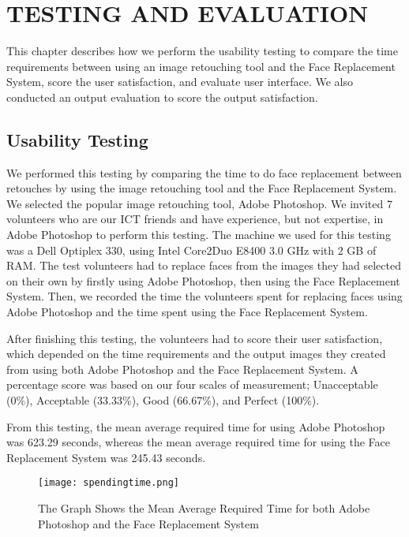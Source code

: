 \chapter{TESTING AND EVALUATION}\label{chap:TESTING AND EVALUATION}
\hspace{0.5in}This chapter describes how we perform the usability testing to compare the time requirements between using an image retouching tool and the Face Replacement System, score the user satisfaction, and evaluate user interface. We also conducted an output evaluation to score the output satisfaction.

\section{Usability Testing}
\hspace{0.5in}We performed this testing by comparing the time to do face replacement between retouches by using the image retouching tool and the Face Replacement System. We selected the popular image retouching tool, Adobe Photoshop. We invited 7 volunteers who are our ICT friends and have experience, but not expertise, in Adobe Photoshop to perform this testing. The machine we used for this testing was a Dell Optiplex 330, using Intel Core2Duo E8400 3.0 GHz with 2 GB of RAM. The test volunteers had to replace faces from the images they had selected on their own by firstly using Adobe Photoshop, then using the Face Replacement System. Then, we recorded the time the volunteers spent for replacing faces using Adobe Photoshop and the time spent using the Face Replacement System.

After finishing this testing, the volunteers had to score their user satisfaction, which depended on the time requirements and the output images they created from using both Adobe Photoshop and the Face Replacement System. A percentage score was based on our four scales of measurement; Unacceptable (0\%), Acceptable (33.33\%), Good (66.67\%), and Perfect (100\%).

From this testing, the mean average required time for using Adobe Photoshop was 623.29 seconds, whereas the mean average required time for using the Face Replacement System was 245.43 seconds.

\begin{figure}[htb]
   \centering
   \texttt{[image: spendingtime.png]}
   \caption{The Graph Shows the Mean Average Required Time for both Adobe Photoshop and the Face Replacement System}
   \label{fig:SpendingTime}
\end{figure}

